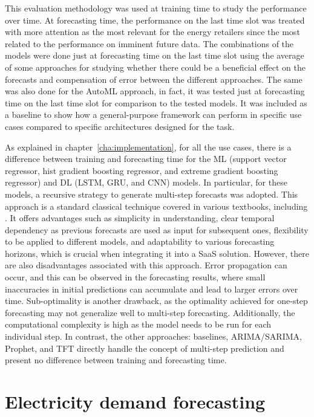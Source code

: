 This evaluation methodology was used at training time to study the performance over time.
At forecasting time, the performance on the last time slot was treated with more attention as the most relevant for the energy retailers since the most related to the performance on imminent future data.
The combinations of the models were done just at forecasting time on the last time slot using the average of some approaches for studying whether there could be a beneficial effect on the forecasts and compensation of error between the different approaches.
The same was also done for the AutoML approach, in fact, it was tested just at forecasting time on the last time slot for comparison to the tested models.
It was included as a baseline to show how a general-purpose framework can perform in specific use cases compared to specific architectures designed for the task.

As explained in chapter~\ref{cha:implementation}, for all the use cases, there is a difference between training and forecasting time for the ML (support vector regressor, hist gradient boosting regressor, and extreme gradient boosting regressor) and DL (LSTM, GRU, and CNN) models.
In particular, for these models, a recursive strategy to generate multi-step forecasts was adopted.
This approach is a standard classical technique covered in various textbooks, including \cite{Manu2022}.
It offers advantages such as simplicity in understanding, clear temporal dependency as previous forecasts are used as input for subsequent ones, flexibility to be applied to different models, and adaptability to various forecasting horizons, which is crucial when integrating it into a SaaS solution.
However, there are also disadvantages associated with this approach.
Error propagation can occur, and this can be observed in the forecasting results, where small inaccuracies in initial predictions can accumulate and lead to larger errors over time.
Sub-optimality is another drawback, as the optimality achieved for one-step forecasting may not generalize well to multi-step forecasting.
Additionally, the computational complexity is high as the model needs to be run for each individual step.
In contrast, the other approaches: baselines, ARIMA/SARIMA, Prophet, and TFT directly handle the concept of multi-step prediction and present no difference between training and forecasting time.


\section{Electricity demand forecasting}
\label{sec:demandval}
\vspace{0.2 cm}

